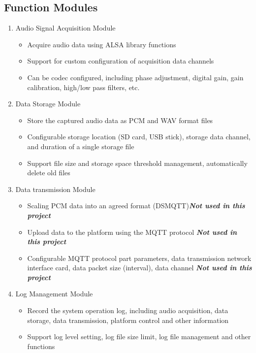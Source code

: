 \documentclass{article}
\begin{document}
\subsection{Function Modules}
\begin{enumerate}
    \item Audio Signal Acquisition Module
    \begin{itemize}
        \item Acquire audio data using ALSA library functions
        \item Support for custom configuration of acquisition data channels
        \item Can be codec configured, including phase adjustment, digital gain, gain calibration, high/low pass filters, etc.
    \end{itemize}
    \item Data Storage Module
    \begin{itemize}
        \item Store the captured audio data as PCM and WAV format files
        \item Configurable storage location (SD card, USB stick), storage data channel, and duration of a single storage file
        \item Support file size and storage space threshold management, automatically delete old files
    \end{itemize}
    \item Data transmission Module
    \begin{itemize}
        \item Scaling PCM data into an agreed format (DSMQTT){\bfseries\emph{Not used in this project}}
        \item Upload data to the platform using the MQTT protocol {\bfseries\emph{Not used in this project}}
        \item Configurable MQTT protocol part parameters, data transmission network interface card, data packet size (interval), data channel {\bfseries\emph{Not used in this project}}
    \end{itemize}
    \item Log Management Module
    \begin{itemize}
        \item Record the system operation log, including audio acquisition, data storage, data transmission, platform control and other information
        \item Support log level setting, log file size limit, log file management and other functions

\end{itemize}
\end{enumerate}
\end{document}
